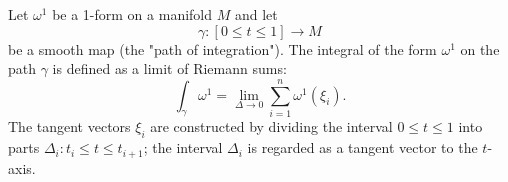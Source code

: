 Let $\omega^1$ be a 1-form on a manifold $M$ and let
$$\gamma: [0 \leq t \leq 1] \to M$$
be a smooth map (the "path of integration"). The integral of the form $\omega^1$ on the path $\gamma$ is defined as a limit of Riemann sums:
$$\int_{\gamma} \omega^1 = \lim_{\Delta \to 0} \sum_{i=1}^{n} \omega^1(\xi_i).$$
The tangent vectors $\xi_i$ are constructed by dividing the interval $0 \leq t \leq 1$ into parts $\Delta_i: t_i \leq t \leq t_{i+1}$; the interval $\Delta_i$ is regarded as a tangent vector to the $t$-axis.
